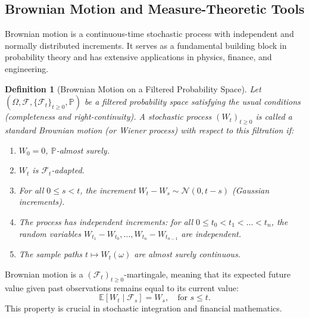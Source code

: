\documentclass[11pt, twoside]{report}
\newtheorem{definition}[theorem]{Definition}
\begin{document}
\subsection{Brownian Motion and Measure-Theoretic Tools}
\label{sec:bm_girsanov}
Brownian motion is a continuous-time stochastic process with independent and normally distributed increments. It serves as a fundamental building block in probability theory and has extensive applications in physics, finance, and engineering.

\begin{definition}[Brownian Motion on a Filtered Probability Space]
Let $(\Omega, \mathcal{F}, \{\mathcal{F}_t\}_{t \geq 0}, \mathbb{P})$ be a filtered probability space satisfying the usual conditions (completeness and right-continuity). A stochastic process $(W_t)_{t \geq 0}$ is called a \emph{standard Brownian motion} (or \emph{Wiener process}) with respect to this filtration if:

\begin{enumerate}
    \item $W_0 = 0$, $\mathbb{P}$-almost surely.
    \item $W_t$ is $\mathcal{F}_t$-adapted.
    \item For all $0 \leq s < t$, the increment $W_t - W_s \sim \mathcal{N}(0, t-s)$ (Gaussian increments).
    \item The process has independent increments: for all $0 \le t_0 < t_1 < \dots < t_n$, the random variables $W_{t_1} - W_{t_0}, \dots, W_{t_n} - W_{t_{n-1}}$ are independent.
    \item The sample paths $t \mapsto W_t(\omega)$ are almost surely continuous.
\end{enumerate}
\end{definition}

Brownian motion is a $(\mathcal{F}_t)_{t \geq 0}$-martingale, meaning that its expected future value given past observations remains equal to its current value:
\begin{equation}
    \mathbb{E}[W_t \mid \mathcal{F}_s] = W_s, \quad \text{for } s \leq t.
\end{equation}
This property is crucial in stochastic integration and financial mathematics.
\end{document}
